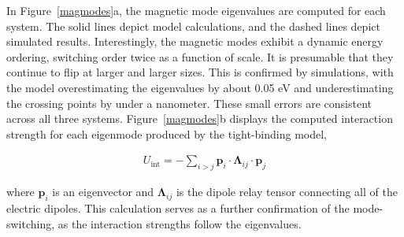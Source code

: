 \documentclass[journal=apchd5,manuscript=article]{achemso}
\begin{document}
In Figure~\ref{magmodes}a, the magnetic mode eigenvalues are computed for each system. The solid lines depict model calculations, and the dashed lines depict simulated results. Interestingly, the magnetic modes exhibit a dynamic energy ordering, switching order twice as a function of scale. It is presumable that they continue to flip at larger and larger sizes. This is confirmed by simulations, with the model overestimating the eigenvalues by about 0.05 eV and underestimating the crossing points by under a nanometer. These small errors are consistent across all three systems. Figure~\ref{magmodes}b displays the computed interaction strength for each eigenmode produced by the tight-binding model,

\begin{equation}
\begin{aligned}
U_{\textrm{int}} = -\sum_{i>j}\textbf{p}_{i}\cdot\boldsymbol{\Lambda}_{ij}\cdot\textbf{p}_{j}
\label{interactionenergy}
\end{aligned}
\end{equation}

\noindent where $\textbf{p}_{i}$ is an eigenvector and $\boldsymbol{\Lambda}_{ij}$ is the dipole relay tensor connecting all of the electric dipoles. This calculation serves as a further confirmation of the mode-switching, as the interaction strengths follow the eigenvalues.
\end{document}
